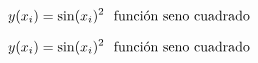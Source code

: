 \documentclass[12pt]{article}
\begin{document}
\begin{equation}y(x_{i}) = \sin(x_{i})^{2} \ \ \textup{función seno cuadrado}\end{equation}

\begin{equation}y(x_{i}) = \sin(x_{i})^{2} \ \ \textup{función seno cuadrado}\end{equation}
\end{document}
